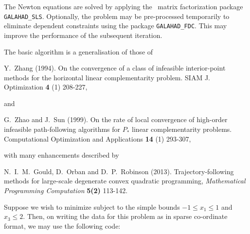 \documentclass{galahad}
\begin{document}
The Newton equations are solved  by applying the
\galahad\ matrix factorization package
{\tt GALAHAD\_SLS}.
Optionally, the problem may be pre-processed temporarily to eliminate dependent
constraints using the package {\tt GALAHAD\_FDC}. This may improve the
performance of the subsequent iteration.

\vspace*{1mm}

\galreferences
\vspace*{1mm}

\noindent
The basic algorithm is a generalisation of those of
\vspace*{1mm}

\noindent
Y.\ Zhang (1994).
On the convergence of a class of infeasible interior-point methods for the
horizontal linear complementarity problem.
SIAM J. Optimization {\bf 4} (1) 208-227,
\vspace*{1mm}

\noindent
and

\noindent
G.\ Zhao and J.\ Sun (1999).
On the rate of local convergence of high-order
infeasible path-following algorithms for $P_*$ linear complementarity
problems.
Computational Optimization and Applications {\bf 14} (1) 293-307,
\vspace*{1mm}

\noindent
with many enhancements described by
\vspace*{1mm}

\noindent
N.\ I.\ M.\ Gould, D.\ Orban and D.\ P.\ Robinson (2013).
Trajectory-following methods for
large-scale  degenerate convex quadratic programming,
{\em Mathematical Programming Computation} {\bf 5(2)} 113-142.


\galexample
Suppose we wish to minimize
subject to the simple bounds
$-1  \leq  x_{1}  \leq  1$ and $x_{3}  \leq  2$.
Then, on writing the data for this problem as
in sparse co-ordinate format, we may use the following code:
\end{document}
